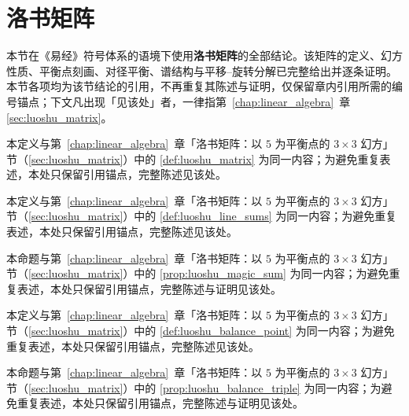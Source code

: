 \section{洛书矩阵}

本节在《易经》符号体系的语境下使用\textbf{洛书矩阵}的全部结论。该矩阵的定义、幻方性质、平衡点刻画、对径平衡、谱结构与平移--旋转分解已完整给出并逐条证明。本节各项均为该节结论的引用，不再重复其陈述与证明，仅保留章内引用所需的编号锚点；下文凡出现「见该处」者，一律指第~\ref{chap:linear_algebra}~章 \cref{sec:luoshu_matrix}。

\begin{definition}[洛书矩阵]\label{def:luoshu_matrix_yijing}
本定义与第~\ref{chap:linear_algebra}~章「洛书矩阵：以 $5$ 为平衡点的 $3\times 3$ 幻方」节（\cref{sec:luoshu_matrix}）中的 \cref{def:luoshu_matrix} 为同一内容；为避免重复表述，本处只保留引用锚点，完整陈述见该处。
\end{definition}

\begin{definition}[行和、列和与对角和]\label{def:luoshu_line_sums_yijing}
本定义与第~\ref{chap:linear_algebra}~章「洛书矩阵：以 $5$ 为平衡点的 $3\times 3$ 幻方」节（\cref{sec:luoshu_matrix}）中的 \cref{def:luoshu_line_sums} 为同一内容；为避免重复表述，本处只保留引用锚点，完整陈述见该处。
\end{definition}

\begin{proposition}[洛书矩阵的幻方性质]\label{prop:luoshu_magic_sum_yijing}
本命题与第~\ref{chap:linear_algebra}~章「洛书矩阵：以 $5$ 为平衡点的 $3\times 3$ 幻方」节（\cref{sec:luoshu_matrix}）中的 \cref{prop:luoshu_magic_sum} 为同一内容；为避免重复表述，本处只保留引用锚点，完整陈述与证明见该处。
\end{proposition}

\begin{definition}[洛书平衡点]\label{def:luoshu_balance_point_yijing}
本定义与第~\ref{chap:linear_algebra}~章「洛书矩阵：以 $5$ 为平衡点的 $3\times 3$ 幻方」节（\cref{sec:luoshu_matrix}）中的 \cref{def:luoshu_balance_point} 为同一内容；为避免重复表述，本处只保留引用锚点，完整陈述见该处。
\end{definition}

\begin{proposition}[平衡点的三重刻画]\label{prop:luoshu_balance_triple_yijing}
本命题与第~\ref{chap:linear_algebra}~章「洛书矩阵：以 $5$ 为平衡点的 $3\times 3$ 幻方」节（\cref{sec:luoshu_matrix}）中的 \cref{prop:luoshu_balance_triple} 为同一内容；为避免重复表述，本处只保留引用锚点，完整陈述与证明见该处。
\end{proposition}

